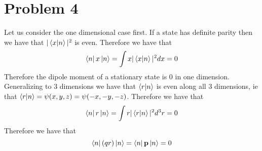 \documentclass[11pt]{article}
\begin{document}
\section*{Problem 4}
Let us consider the one dimensional case first. If a state has definite parity then 
we have that $|\bra{x}\ket{n}|^2$ is even. Therefore we have that 
$$\bra{n}x\ket{n}=\int x|\bra{x}\ket{n}|^2 dx=0$$
Therefore the dipole moment of a stationary state is $0$ in one dimension. 
Generalizing to 3 dimensions we have that $\bra{r}\ket{n}$ is even along all 
3 dimensions, ie that $\bra{r}\ket{n}=\psi(x,y,z)=\psi(-x,-y,-z)$. Therefore we have that 
$$\bra{n}r\ket{n}=\int r|\bra{r}\ket{n}|^2 d^3r=0$$
Therefore we have that
$$\bra{n}(qr)\ket{n}=\bra{n}\mathbf{p}\ket{n}=0$$
\end{document}
